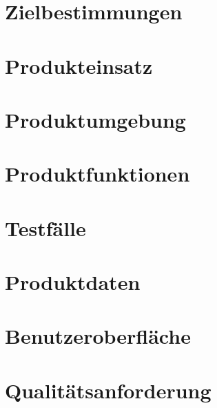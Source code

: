 \documentclass{report}
\begin{document}
	\chapter{Zielbestimmungen}\label{chp:zielbestimmungen}
	
	
	\chapter{Produkteinsatz}\label{chp:produkteinsatz}
	
		
	\chapter{Produktumgebung}\label{chp:produktumgebung}
	
	

	\chapter{Produktfunktionen}\label{chp:produktfunktionen}
	

	\chapter{Testfälle}\label{chp:testfaelle}
	
	
	\chapter{Produktdaten}\label{chp:produktdaten}
	
	
	\chapter{Benutzeroberfläche}\label{chp:benutzeroberflaeche}
	
	
	\chapter{Qualitätsanforderung}\label{chp:qualitaetsanforderung}
	
	
	
\end{document}
